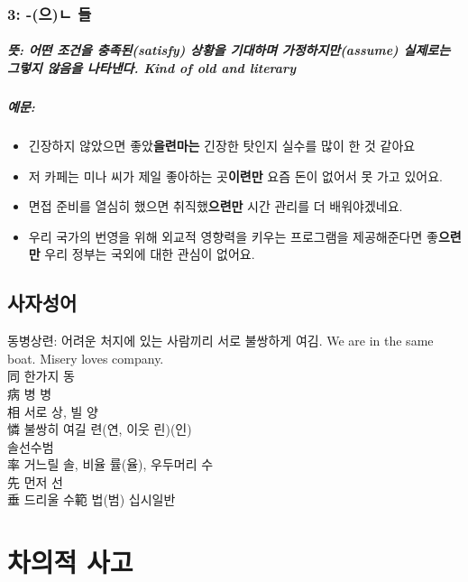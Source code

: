 \documentclass[a4paper, 11pt, oneside]{book}
\begin{document}
\subsection{3: -(으)ㄴ 들}
\paragraph{뜻: 어떤 조건을 충족된(satisfy) 상황을 기대하며 가정하지만(assume) 실제로는 그렇지 않음을 나타낸다. Kind of old and literary}
\paragraph{예문:}
\begin{itemize}
	\item 긴장하지 않았으면 좋았\textbf{을련마는} 긴장한 탓인지 실수를 많이 한 것 같아요 
	\item 저 카페는 미나 씨가 제일 좋아하는 곳\textbf{이련만} 요즘 돈이 없어서 못 가고 있어요.
	\item 면접 준비를 열심히 했으면 취직했\textbf{으련만} 시간 관리를 더 배워야겠네요. 
	\item 우리 국가의 번영을 위해 외교적 영향력을 키우는 프로그램을 제공해준다면 좋\textbf{으련만} 우리 정부는 국외에 대한 관심이 없어요.   
\end{itemize}

\section{사자성어}
동병상련: 어려운 처지에 있는 사람끼리 서로 불쌍하게 여김. We are in the same boat. Misery loves company.\\
同 한가지 동\\
病 병 병\\
相 서로 상, 빌 양\\
憐 불쌍히 여길 련(연, 이웃 린)(인)\\


솔선수범\\
率 거느릴 솔, 비율 률(율), 우두머리 수\\
先 먼저 선\\
垂 드리울 수範 법(범)
십시일반 


\chapter{차의적 사고}
\end{document}

